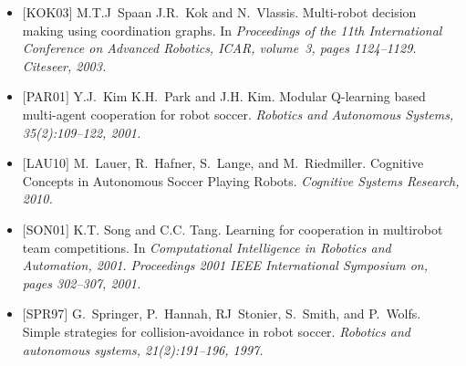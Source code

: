 \documentclass{beamer}
\begin{document}
\begin{frame}[allowframebreaks]
\begin{itemize}
	\item $[$KOK03$]$
	M.T.J~Spaan J.R.~Kok and N.~Vlassis.
	 Multi-robot decision making using coordination graphs.
	 In \em Proceedings of the 11th International Conference on Advanced
	  Robotics, ICAR, volume~3, pages 1124--1129. Citeseer, 2003.

	\item $[$PAR01$]$
	Y.J.~Kim K.H.~Park and J.H. Kim.
	 Modular Q-learning based multi-agent cooperation for robot soccer.
	 \em Robotics and Autonomous Systems, 35(2):109--122, 2001.

	\item $[$LAU10$]$
	M.~Lauer, R.~Hafner, S.~Lange, and M.~Riedmiller.
	 Cognitive Concepts in Autonomous Soccer Playing Robots.
	 \em Cognitive Systems Research, 2010.

	\item $[$SON01$]$
	K.T. Song and C.C. Tang.
	 Learning for cooperation in multirobot team competitions.
	 In \em Computational Intelligence in Robotics and Automation, 2001.
	  Proceedings 2001 IEEE International Symposium on, pages 302--307, 2001.

	\item $[$SPR97$]$
	G.~Springer, P.~Hannah, RJ~Stonier, S.~Smith, and P.~Wolfs.
	 Simple strategies for collision-avoidance in robot soccer.
	 \em Robotics and autonomous systems, 21(2):191--196, 1997.
\end{itemize}
\end{frame}

\end{document}

